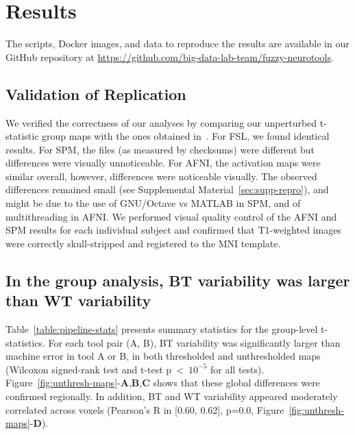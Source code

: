 \documentclass[11pt,onecolumn]{article}
\begin{document}
\section{Results}
The scripts, Docker images, and data to reproduce the results are available
in our GitHub repository at
\url{https://github.com/big-data-lab-team/fuzzy-neurotools}.


\subsection{Validation of Replication}

We verified the correctness of our analyses by comparing our unperturbed
t-statistic group maps with the ones obtained
in~\cite{bowring2019exploring}. For FSL, we found
identical results. For SPM, the files (as measured by checksums) were different but differences
were visually unnoticeable. For AFNI, the activation maps were similar
overall, however, differences were noticeable visually.
The observed differences remained small (see Supplemental Material~\ref{sec:supp-repro}), and might be due to the use of
GNU/Octave vs MATLAB in SPM, and of multithreading in AFNI. We performed visual quality control of the AFNI
and SPM results for each individual subject and confirmed that T1-weighted images were
correctly skull-stripped and registered to the MNI template.

\subsection{In the group analysis, BT variability was larger than WT variability}

Table~\ref{table:pipeline-stats} presents summary statistics for the
group-level t-statistics. For each tool pair (A, B), BT variability was
significantly larger than machine error in tool A or B, in both thresholded
and unthresholded maps (Wilcoxon signed-rank test and t-test p~\textless~$10^{-5}$ for all tests).
Figure~\ref{fig:unthresh-maps}-\textbf{A},\textbf{B},\textbf{C} shows that
these global differences were confirmed regionally.
In addition, BT and WT variability appeared moderately correlated across voxels (Pearson's R
in [0.60, 0.62], p=0.0, Figure~\ref{fig:unthresh-maps}-\textbf{D}). 
\end{document}
